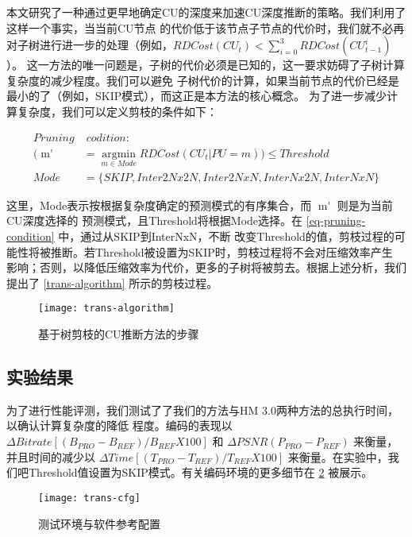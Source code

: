 本文研究了一种通过更早地确定CU的深度来加速CU深度推断的策略。我们利用了这样一个事实，当当前CU节点
的代价低于该节点子节点的代价时，我们就不必再对子树进行进一步的处理（例如，$RDCost(CU_t) < \sum_{i=0}^3 RDCost(CU^i_{t-1})$）。
这一方法的唯一问题是，子树的代价必须是已知的，这一要求妨碍了子树计算复杂度的减少程度。我们可以避免
子树代价的计算，如果当前节点的代价已经是最小的了（例如，SKIP模式），而这正是本方法的核心概念。
为了进一步减少计算复杂度，我们可以定义剪枝的条件如下：

\begin{equation}
\label{eq-pruning-condition}
\begin{split}
Pruning & \; codition: \\
(\mathop{m'} & =  \mathop{argmin}\limits_{m \in Mode} RDCost(CU_t | PU=m)) \le Threshold \\
Mode & = \{ SKIP, Inter2Nx2N, Inter2NxN, InterNx2N, InterNxN \} 
\end{split}
\end{equation}

这里，Mode表示按根据复杂度确定的预测模式的有序集合，而 $\mathop{m'}$ 则是为当前CU深度选择的
预测模式，且Threshold将根据Mode选择。在 \ref{eq-pruning-condition} 中，通过从SKIP到InterNxN，不断
改变Threshold的值，剪枝过程的可能性将被推断。若Threshold被设置为SKIP时，剪枝过程将不会对压缩效率产生
影响；否则，以降低压缩效率为代价，更多的子树将被剪去。根据上述分析，我们提出了 \ref{trans-algorithm} 
所示的剪枝过程。


\begin{figure}[H] %
  \centering
  \texttt{[image: trans-algorithm]}
  \caption{基于树剪枝的CU推断方法的步骤}
  \label{fig:trans-algorithm}
\end{figure}

\subsection{实验结果}

为了进行性能评测，我们测试了了我们的方法与HM 3.0两种方法的总执行时间，以确认计算复杂度的降低
程度。编码的表现以 $\Delta Bitrate[ (B_{PRO} - B_{REF})/B_{REF} X 100 ]$ 和 
$ \Delta PSNR(P_{PRO} - P_{REF})$ 来衡量，并且时间的减少以 $ \Delta Time[ (T_{PRO} - T_{REF})/T_{REF} X 100 ]$
来衡量。在实验中，我们吧Threshold值设置为SKIP模式。有关编码环境的更多细节在 \ref{fig:trans-cfg} 被展示。

\begin{figure}[H] %
  \centering
  \texttt{[image: trans-cfg]}
  \caption{测试环境与软件参考配置}
  \label{fig:trans-cfg}
\end{figure}

